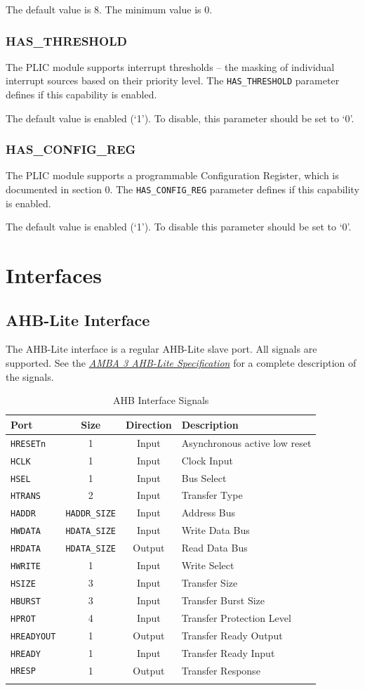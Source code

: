 \documentclass[]{article}
\begin{document}
The default value is 8. The minimum value is 0.

\subsubsection{HAS\_THRESHOLD}

The PLIC module supports interrupt thresholds -- the masking of
individual interrupt sources based on their priority level. The
\texttt{HAS\_THRESHOLD} parameter defines if this capability is enabled.

The default value is enabled (`1'). To disable, this parameter should be
set to `0'.

\subsubsection{HAS\_CONFIG\_REG}

The PLIC module supports a programmable Configuration Register, which is
documented in section 0. The \texttt{HAS\_CONFIG\_REG} parameter defines
if this capability is enabled.

The default value is enabled (`1'). To disable this parameter should be
set to `0'.

\section{Interfaces}

\subsection{AHB-Lite Interface}

The AHB-Lite interface is a regular AHB-Lite slave port. All signals are
supported. See the
\emph{\href{https://www.arm.com/products/system-ip/amba-specifications}{AMBA
3 AHB-Lite Specification}} for a complete description of the signals.

\begin{longtable}[]{@{}lccl@{}}
\toprule
\textbf{Port} & \textbf{Size} & \textbf{Direction} & \textbf{Description}\tabularnewline
\midrule
\endhead
\texttt{HRESETn} & 1 & Input & Asynchronous active low reset\tabularnewline
\texttt{HCLK} & 1 & Input & Clock Input\tabularnewline
\texttt{HSEL} & 1 & Input & Bus Select\tabularnewline
\texttt{HTRANS} & 2 & Input & Transfer Type\tabularnewline
\texttt{HADDR} & \texttt{HADDR\_SIZE} & Input & Address Bus\tabularnewline
\texttt{HWDATA} & \texttt{HDATA\_SIZE} & Input & Write Data Bus\tabularnewline
\texttt{HRDATA} & \texttt{HDATA\_SIZE} & Output & Read Data Bus\tabularnewline
\texttt{HWRITE} & 1 & Input & Write Select\tabularnewline
\texttt{HSIZE} & 3 & Input & Transfer Size\tabularnewline
\texttt{HBURST} & 3 & Input & Transfer Burst Size\tabularnewline
\texttt{HPROT} & 4 & Input & Transfer Protection Level\tabularnewline
\texttt{HREADYOUT} & 1 & Output & Transfer Ready Output\tabularnewline
\texttt{HREADY} & 1 & Input & Transfer Ready Input\tabularnewline
\texttt{HRESP} & 1 & Output & Transfer Response\tabularnewline
\bottomrule
\caption{AHB Interface Signals}
\label{tab:AHBIF}
\end{longtable}
\end{document}

